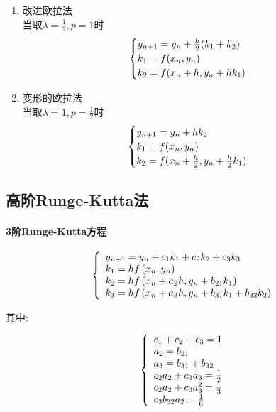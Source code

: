 \documentclass[12pt]{report}
\begin{document}
\begin{enumerate}
	\item 改进欧拉法 \\
	当取$\lambda = \frac{1}{2}, p = 1$时
	\begin{equation}
		\notag
		\begin{cases}
			y_{n+1} = y_n + \frac{h}{2} (k_1 + k_2) \\
			k_1 = f(x_n , y_n) \\
			k_2 = f(x_{n}+h, y_{n}+hk_1)
		\end{cases}
	\end{equation}

	\item 变形的欧拉法 \\
	当取$\lambda = 1, p = \frac{1}{2}$时
	\begin{equation}
		\notag
		\begin{cases}
			y_{n+1} = y_n + hk_2 \\
			k_1 = f(x_n , y_n) \\
			k_2 = f(x_{n}+\frac{h}{2}, y_{n}+\frac{h}{2}k_1)
		\end{cases}
	\end{equation}
\end{enumerate}

\subsection{高阶Runge-Kutta法}

\paragraph{3阶Runge-Kutta方程}

\begin{equation}
	\notag
	\left\{\begin{array}{l}
	y_{n+1}=y_{n}+c_{1} k_{1}+c_{2} k_{2}+c_{3} k_{3} \\
	k_{1}=h f\left(x_{n}, y_{n}\right) \\
	k_{2}=h f\left(x_{n}+a_{2} h, y_{n}+b_{21} k_{1}\right) \\
	k_{3}=h f\left(x_{n}+a_{3} h, y_{n}+b_{31} k_{1}+b_{32} k_{2}\right)
	\end{array}\right.
\end{equation}

其中:

\begin{equation}
	\notag
	\left\{\begin{array}{l}
	c_{1}+c_{2}+c_{3}=1 \\
	a_{2}=b_{21} \\
	a_{3}=b_{31}+b_{32} \\
	c_{2} a_{2}+c_{3} a_{3}=\frac{1}{2} \\
	c_{2} a_{2}+c_{3} a_{3}^{2}=\frac{1}{3} \\
	c_{3} b_{32} a_{2}=\frac{1}{6}
	\end{array}\right.
\end{equation}
\end{document}
